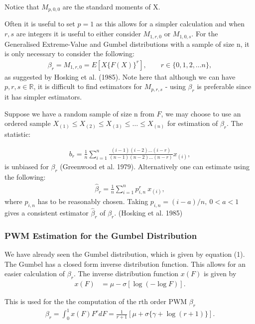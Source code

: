 \documentclass{article}
\begin{document}
Notice that $M_{p,0,0}$ are the standard moments of X.

Often it is useful to set $p=1$ as this allows for a simpler calculation and when $r,s$ are integers it is useful to either consider $M_{1,r,0}$ or $M_{1,0,s}$. For the Generalised Extreme-Value and Gumbel distributions with a sample of size n, it is only necessary to consider the following:
\begin{align*}
\beta_r = M_{1,r,0}  = E[X\{F(X)\}^r], \qquad r \in \{0, 1, 2, \ldots n\},
\end{align*}
as suggested by Hosking et al. (1985). Note here that although we can have $p, r, s \in \mathbb{R} $, it is difficult to find estimators for $M_{p,r,s}$ - using $\beta_r$ is preferable since it has simpler estimators. 

Suppose we have a random sample of size n from $F$, we may choose to use an ordered sample $X_{(1)} \leq X_{(2)} \leq X_{(3)} \leq \ldots \leq X_{(n)}$ for estimation of $\beta_r$. The statistic:

\begin{align*}
b_r = \frac{1}{n} \sum_{i = 1}^n \frac{(i-1)(i-2) \ldots (i-r)}{(n-1)(n-2) \ldots (n-r)} x_{(i)},
\end{align*}
is unbiased for $\beta_r$ (Greenwood et al. 1979). Alternatively one can estimate using the following:
\begin{align*}
\hat{\beta}_r = \frac{1}{n} \sum_{i=1}^n p_{i,n}^r\ x_{(i)},
\end{align*}
where $p_{i,n}$ has to be reasonably chosen. Taking $p_{i,n} = (i-a)/n,\ 0<a<1$ gives a consistent estimator $\hat{\beta}_r$ of $\beta_r$. (Hosking et al. 1985)

\subsubsection{PWM Estimation for the Gumbel Distribution}

We have already seen the Gumbel distribution, which is given by equation (1). The Gumbel has a closed form inverse distribution function. This allows for an easier calculation of $\beta_r$. The inverse distribution function $x(F)$ is given by
\begin{align}
x(F) &= \mu - \sigma  \left [\log (-\log F)\right].
\end{align}

This is used for the the computation of the rth order PWM $\beta_r$
\begin{align}
\beta_r = \int_0^1 x(F) F^r dF = \frac{1}{r+1} [\mu + \sigma\{\gamma + \log(r+1)\}]. \label{betargumbel}
\end{align}
\end{document}
